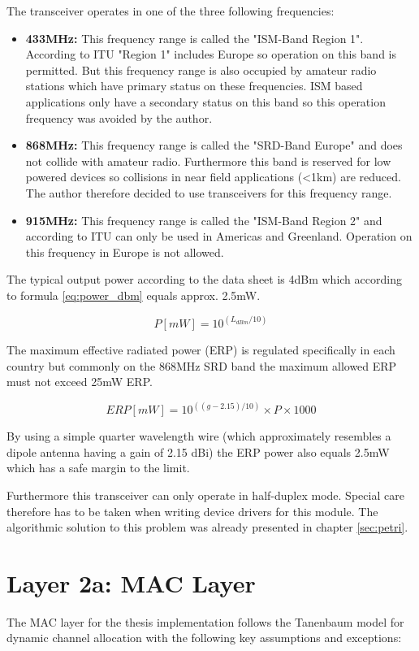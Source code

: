 The transceiver operates in one of the three following frequencies:
\begin{itemize}
    \item \textbf{433MHz:} This frequency range is called the "ISM-Band Region 1". According to ITU "Region 1" includes Europe so operation on this band is permitted. But this frequency range is also occupied by amateur radio stations which have primary status on these frequencies. ISM based applications only have a secondary status on this band so this operation frequency was avoided by the author.
    \item \textbf{868MHz:} This frequency range is called the "SRD-Band Europe" and does not collide with amateur radio. Furthermore this band is reserved for low powered devices so collisions in near field applications (<1km) are reduced. The author therefore decided to use transceivers for this frequency range.
    \item \textbf{915MHz:} This frequency range is called the "ISM-Band Region 2" and according to ITU can only be used in Americas and Greenland. Operation on this frequency in Europe is not allowed.
\end{itemize}

The typical output power according to the data sheet is 4dBm which according to formula \ref{eq:power_dbm} equals approx. 2.5mW.

\begin{equation}
\label{eq:power_dbm}
P[mW] = 10^{(L_{dBm}/10)}
\end{equation}

The maximum effective radiated power (ERP) is regulated specifically in each country but commonly on the 868MHz SRD band the maximum allowed ERP must not exceed 25mW ERP.

\begin{equation}
ERP[mW] = 10^{((g-2.15)/10)} \times P \times 1000
\label{eq:power_dbm}
\end{equation}

By using a simple quarter wavelength wire (which approximately resembles a dipole antenna having a gain of 2.15 dBi) the ERP power also equals 2.5mW which has a safe margin to the limit.

Furthermore this transceiver can only operate in half-duplex mode. Special care therefore has to be taken when writing device drivers for this module. The algorithmic solution to this problem was already presented in chapter \ref{sec:petri}.

\section{Layer 2a: MAC Layer}%
The MAC layer for the thesis implementation follows the Tanenbaum \cite{tannenbaum} model for dynamic channel allocation with the following key assumptions and exceptions:

